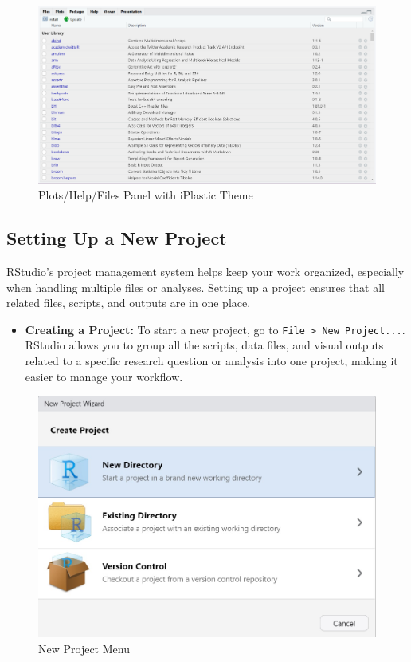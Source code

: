 \documentclass[
]{book}
\providecommand{\tightlist}{%
  \setlength{\itemsep}{0pt}\setlength{\parskip}{0pt}}
\begin{document}
\begin{figure}
\centering
\includegraphics[width=1\linewidth,height=\textheight,keepaspectratio]{images/files-panel.png}
\caption{Plots/Help/Files Panel with iPlastic Theme}
\end{figure}

\subsection*{Setting Up a New Project}\label{setting-up-a-new-project}

RStudio's project management system helps keep your work organized, especially when handling multiple files or analyses. Setting up a project ensures that all related files, scripts, and outputs are in one place.

\begin{itemize}
\tightlist
\item
  \textbf{Creating a Project:} To start a new project, go to \texttt{File\ \textgreater{}\ New\ Project...}. RStudio allows you to group all the scripts, data files, and visual outputs related to a specific research question or analysis into one project, making it easier to manage your workflow.
\end{itemize}

\begin{figure}
\centering
\includegraphics[width=1\linewidth,height=\textheight,keepaspectratio]{images/new-project.jpg}
\caption{New Project Menu}
\end{figure}
\end{document}
